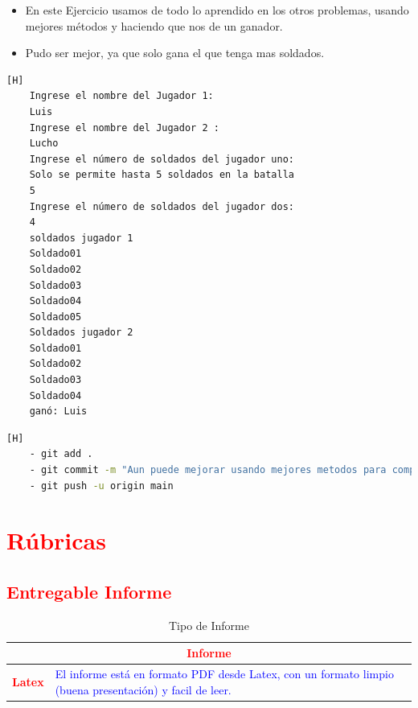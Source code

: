 \documentclass{article}
\begin{document}

\clearpage

\begin{itemize}
	\item En este Ejercicio usamos de todo lo aprendido en los otros problemas, usando mejores métodos y haciendo que nos de un ganador.
	\item Pudo ser mejor, ya que solo gana el que tenga mas soldados.
\end{itemize}

\begin{lstlisting}[language=bash,caption={Ejecución del Ejercicio03}][H]
	Ingrese el nombre del Jugador 1: 
	Luis
	Ingrese el nombre del Jugador 2 : 
	Lucho
	Ingrese el número de soldados del jugador uno: 
	Solo se permite hasta 5 soldados en la batalla
	5
	Ingrese el número de soldados del jugador dos: 
	4
	soldados jugador 1
	Soldado01
	Soldado02
	Soldado03
	Soldado04
	Soldado05
	Soldados jugador 2
	Soldado01
	Soldado02
	Soldado03
	Soldado04
	ganó: Luis
\end{lstlisting}
\begin{lstlisting}[language=bash,caption={Commit: Aun puede mejorar usando mejores metodos para comprobar mas cosas del Ejercicio05 pero por ahora cumple la funsion de tener un ganador, ademas estoy confiando en el usuario}][H]
	- git add .
	- git commit -m "Aun puede mejorar usando mejores metodos para comprobar mas cosas del Ejercicio05 pero por ahora cumple la funsion de tener un ganador, ademas estoy confiando en el usuario"			
	- git push -u origin main
\end{lstlisting}

	
	\section{\textcolor{red}{Rúbricas}}
	
	\subsection{\textcolor{red}{Entregable Informe}}
	\begin{table}[H]
		\caption{Tipo de Informe}
		\setlength{\tabcolsep}{0.5em} %
		{\renewcommand{\arraystretch}{1.5}%
		\begin{tabular}{|p{3cm}|p{12cm}|}
			\hline
			\multicolumn{2}{|c|}{\textbf{\textcolor{red}{Informe}}}  \\
			\hline 
			\textbf{\textcolor{red}{Latex}} & \textcolor{blue}{El informe está en formato PDF desde Latex,  con un formato limpio (buena presentación) y facil de leer.}   \\ 
			\hline 
			
			
		\end{tabular}
	}
	\end{table}
	
\end{document}
